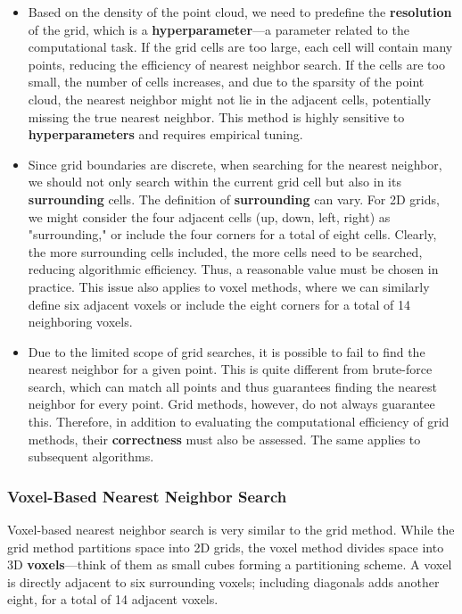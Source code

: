 \begin{itemize}
	\item Based on the density of the point cloud, we need to predefine the \textbf{resolution} of the grid, which is a \textbf{hyperparameter}—a parameter related to the computational task. If the grid cells are too large, each cell will contain many points, reducing the efficiency of nearest neighbor search. If the cells are too small, the number of cells increases, and due to the sparsity of the point cloud, the nearest neighbor might not lie in the adjacent cells, potentially missing the true nearest neighbor. This method is highly sensitive to \textbf{hyperparameters} and requires empirical tuning.
	\item Since grid boundaries are discrete, when searching for the nearest neighbor, we should not only search within the current grid cell but also in its \textbf{surrounding} cells. The definition of \textbf{surrounding} can vary. For 2D grids, we might consider the four adjacent cells (up, down, left, right) as "surrounding," or include the four corners for a total of eight cells. Clearly, the more surrounding cells included, the more cells need to be searched, reducing algorithmic efficiency. Thus, a reasonable value must be chosen in practice. This issue also applies to voxel methods, where we can similarly define six adjacent voxels or include the eight corners for a total of 14 neighboring voxels.
	\item Due to the limited scope of grid searches, it is possible to fail to find the nearest neighbor for a given point. This is quite different from brute-force search, which can match all points and thus guarantees finding the nearest neighbor for every point. Grid methods, however, do not always guarantee this. Therefore, in addition to evaluating the computational efficiency of grid methods, their \textbf{correctness} must also be assessed. The same applies to subsequent algorithms.
\end{itemize}

\subsubsection{Voxel-Based Nearest Neighbor Search}
Voxel-based nearest neighbor search is very similar to the grid method. While the grid method partitions space into 2D grids, the voxel method divides space into 3D \textbf{voxels}—think of them as small cubes forming a partitioning scheme. A voxel is directly adjacent to six surrounding voxels; including diagonals adds another eight, for a total of 14 adjacent voxels.

